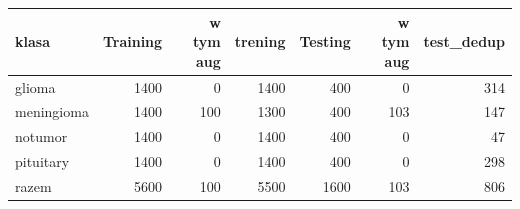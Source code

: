 \begin{tabular}{lrrrrrr}
\toprule
klasa & Training & w tym aug & trening & Testing & w tym aug & test\_dedup \\
\midrule
glioma & 1400 & 0 & 1400 & 400 & 0 & 314 \\
meningioma & 1400 & 100 & 1300 & 400 & 103 & 147 \\
notumor & 1400 & 0 & 1400 & 400 & 0 & 47 \\
pituitary & 1400 & 0 & 1400 & 400 & 0 & 298 \\
\midrule
razem & 5600 & 100 & 5500 & 1600 & 103 & 806 \\
\bottomrule
\end{tabular}
